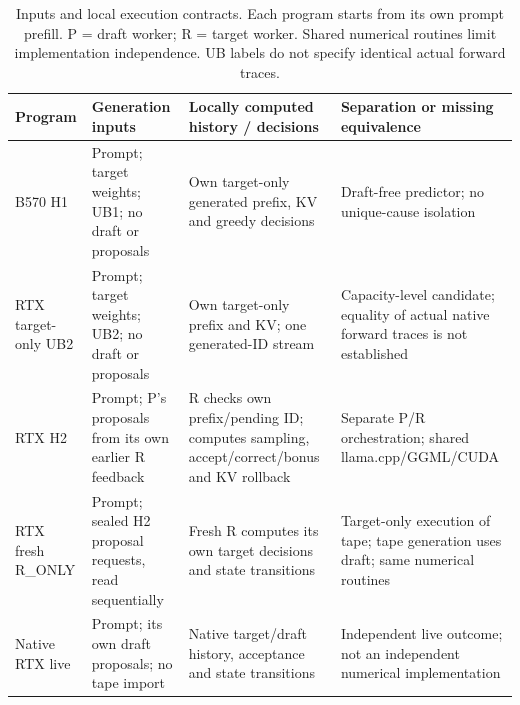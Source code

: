 \begin{table}[t]
\caption{Inputs and local execution contracts. Each program starts from its own prompt prefill. P = draft worker; R = target worker. Shared numerical routines limit implementation independence. UB labels do not specify identical actual forward traces.}
\label{tab:inputcontracts}
\centering
\begin{tabular}{@{}>{\raggedright\arraybackslash}p{1.03in}>{\raggedright\arraybackslash}p{1.43in}>{\raggedright\arraybackslash}p{2.00in}>{\raggedright\arraybackslash}p{1.54in}@{}}
\toprule
Program & Generation inputs & Locally computed history / decisions & Separation or missing equivalence \\
\midrule
B570 H1 & Prompt; target weights; UB1; no draft or proposals & Own target-only generated prefix, KV and greedy decisions & Draft-free predictor; no unique-cause isolation \\
RTX target-only UB2 & Prompt; target weights; UB2; no draft or proposals & Own target-only prefix and KV; one generated-ID stream & Capacity-level candidate; equality of actual native forward traces is not established \\
RTX H2 & Prompt; P's proposals from its own earlier R feedback & R checks own prefix/pending ID; computes sampling, accept/correct/bonus and KV rollback & Separate P/R orchestration; shared llama.cpp/GGML/CUDA \\
RTX fresh R\_ONLY & Prompt; sealed H2 proposal requests, read sequentially & Fresh R computes its own target decisions and state transitions & Target-only execution of tape; tape generation uses draft; same numerical routines \\
Native RTX live & Prompt; its own draft proposals; no tape import & Native target/draft history, acceptance and state transitions & Independent live outcome; not an independent numerical implementation \\
\bottomrule
\end{tabular}
\end{table}

